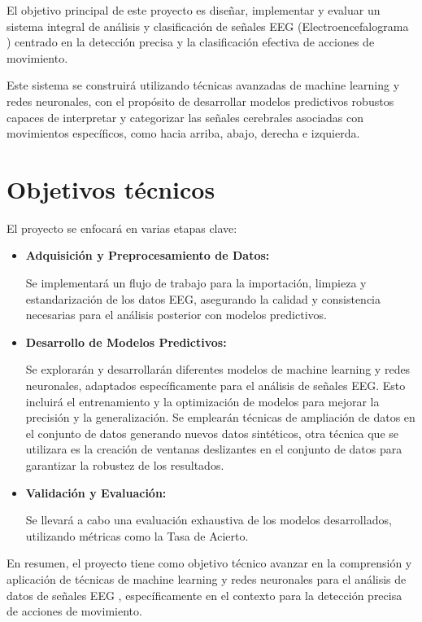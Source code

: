 
El objetivo principal de este proyecto es diseñar, implementar y evaluar un sistema integral de análisis y clasificación de señales EEG (Electroencefalograma ) centrado en la detección precisa y la clasificación efectiva de acciones de movimiento. 

Este sistema se construirá utilizando técnicas avanzadas de machine learning y redes neuronales, con el propósito de desarrollar modelos predictivos robustos capaces de interpretar y categorizar las señales cerebrales asociadas con movimientos específicos, como hacia arriba, abajo, derecha e izquierda.


\section{Objetivos  técnicos}


El proyecto se enfocará en varias etapas clave:

\begin{itemize}
\item
\textbf{Adquisición y Preprocesamiento de Datos:}

 Se implementará un flujo de trabajo para la importación, limpieza y estandarización de los datos EEG, asegurando la calidad y consistencia necesarias para el análisis posterior con modelos predictivos.

\item
\textbf{Desarrollo de Modelos Predictivos:}

 Se explorarán y desarrollarán diferentes modelos de machine learning y redes neuronales, adaptados específicamente para el análisis de señales EEG. Esto incluirá el entrenamiento y la optimización de modelos para mejorar la precisión y la generalización. Se emplearán técnicas de ampliación de datos en el conjunto de datos generando nuevos datos sintéticos, otra técnica que se utilizara es la creación de ventanas deslizantes en el conjunto de datos para garantizar la robustez de los resultados.

\item
\textbf{Validación y Evaluación:} 

Se llevará a cabo una evaluación exhaustiva de los modelos desarrollados, utilizando métricas como la Tasa de Acierto.

\end{itemize}

En resumen, el proyecto tiene como objetivo técnico avanzar en la comprensión y aplicación de técnicas de machine learning y redes neuronales para el análisis de datos de señales EEG , específicamente en el contexto  para la detección precisa de acciones de movimiento.


